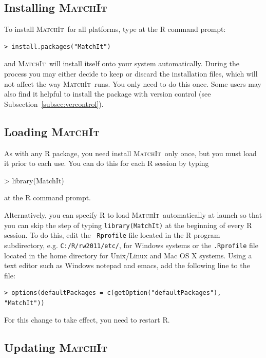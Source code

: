 \documentclass[oneside,letterpaper,titlepage]{article}
\newcommand{\MatchIt}{\textsc{MatchIt}}
\begin{document}
\subsection{Installing \MatchIt}
\label{subsec:install}

To install \MatchIt\ for all platforms, type at the R command prompt:
\begin{verbatim}
> install.packages("MatchIt")
\end{verbatim}
and \MatchIt\ will install itself onto your system automatically.
During the process you may either decide to keep or discard the
installation files, which will not affect the way \MatchIt\ runs.  You
only need to do this once.  Some users may also find it helpful to
install the package with version control (see
Subsection~\ref{subsec:vercontrol}).

\subsection{Loading \MatchIt}
\label{subsec:load}

As with any R package, you need install \MatchIt\ only once, but you
must load it prior to each use.  You can do this for each R session by
typing

\begin{Schunk}
\begin{Sinput}
> library(MatchIt)
\end{Sinput}
\end{Schunk}
at the R command prompt.  

Alternatively, you can specify R to load \MatchIt\ automatically at
launch so that you can skip the step of typing {\tt library(MatchIt)}
at the beginning of every R session.  To do this, edit the {\tt
  Rprofile} file located in the R program subdirectory, e.g.
\texttt{C:/R/rw2011/etc/}, for Windows systems or the {\tt .Rprofile}
file located in the home directory for Unix/Linux and Mac OS X
systems.  Using a text editor such as Windows notepad and emacs, add
the following line to the file:
\begin{verbatim}
> options(defaultPackages = c(getOption("defaultPackages"), "MatchIt"))
\end{verbatim}
For this change to take effect, you need to restart R.

\subsection{Updating \MatchIt}
\end{document}
